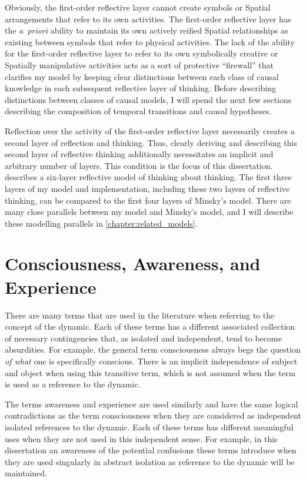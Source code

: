 Obviously, the first-order reflective layer cannot create symbols or
Spatial arrangements that refer to its own activities.  The
first-order reflective layer has the \emph{a~priori} ability to
maintain its own actively reified Spatial relationships as existing
between symbols that refer to physical activities.  The lack of the
ability for the first-order reflective layer to refer to its own
symbolically creative or Spatially manipulative activities acts as a
sort of protective ``firewall'' that clarifies my model by keeping
clear distinctions between each class of causal knowledge in each
subsequent reflective layer of thinking.  Before describing
distinctions between classes of causal models, I will spend the next
few sections describing the composition of temporal transitions and
causal hypotheses.

Reflection over the activity of the first-order reflective layer
necessarily creates a second layer of reflection and thinking.  Thus,
clearly deriving and describing this second layer of reflective
thinking additionally necessitates an implicit and arbitrary number of
layers.  This condition is the focus of this dissertation.
\cite{minsky:2006} describes a six-layer reflective model of thinking
about thinking.  The first three layers of my model and
implementation, including these two layers of reflective thinking, can
be compared to the first four layers of Minsky's model.  There are
many close parallels between my model and Minsky's model, and I will
describe these modelling parallels in
\autoref{chapter:related_models}.

\section{Consciousness, Awareness, and Experience}

There are many terms that are used in the literature when referring to
the concept of the dynamic.  Each of these terms has a different
associated collection of necessary contingencies that, as isolated and
independent, tend to become absurdities.  For example, the general
term consciousness always begs the question \emph{of what} one is
specifically conscious.  There is an implicit independence of subject
and object when using this transitive term, which is not assumed when
the term is used as a reference to the dynamic.

The terms awareness and experience are used similarly and have the
same logical contradictions as the term consciousness when they are
considered as independent isolated references to the dynamic.  Each of
these terms has different meaningful uses when they are not used in
this independent sense.  For example, in this dissertation an
awareness of the potential confusions these terms introduce when they
are used singularly in abstract isolation as reference to the dynamic
will be maintained.

